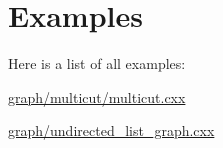 \section{Examples}
Here is a list of all examples\+:\begin{DoxyCompactItemize}
\item 
\hyperlink{graph_2multicut_2multicut_8cxx-example}{graph/multicut/multicut.\+cxx}
\item 
\hyperlink{graph_2undirected_list_graph_8cxx-example}{graph/undirected\+\_\+list\+\_\+graph.\+cxx}
\end{DoxyCompactItemize}
